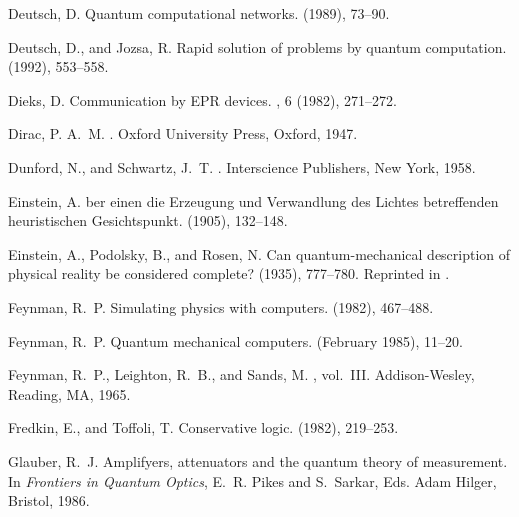 \begin{thebibliography}{100}
{\sc Deutsch, D.}
\newblock Quantum computational networks.
 (1989), 73--90.

{\sc Deutsch, D., and Jozsa, R.}
\newblock Rapid solution of problems by quantum computation.
 (1992),
  553--558.

{\sc Dieks, D.}
\newblock Communication by {EPR} devices.
, 6 (1982), 271--272.

{\sc Dirac, P. A.~M.}
.
\newblock Oxford University Press, Oxford, 1947.

{\sc Dunford, N., and Schwartz, J.~T.}
.
\newblock Interscience Publishers, New York, 1958.

{\sc Einstein, A.}
ber einen die Erzeugung und Verwandlung des Lichtes
  betreffenden heuristischen Gesichtspunkt.
 (1905), 132--148.

{\sc Einstein, A., Podolsky, B., and Rosen, N.}
\newblock Can quantum-mechanical description of physical reality be considered
  complete?
 (1935), 777--780.
\newblock Reprinted in \cite[pp. 138-141]{wheeler-Zurek:83}.

{\sc Feynman, R.~P.}
\newblock Simulating physics with computers.
 (1982),
  467--488.

{\sc Feynman, R.~P.}
\newblock Quantum mechanical computers.
 (February 1985), 11--20.

{\sc Feynman, R.~P., Leighton, R.~B., and Sands, M.}
, vol.~III.
\newblock Addison-Wesley, Reading, MA, 1965.

{\sc Fredkin, E., and Toffoli, T.}
\newblock Conservative logic.
 (1982),
  219--253.

{\sc Glauber, R.~J.}
\newblock Amplifyers, attenuators and the quantum theory of measurement.
\newblock In {\em Frontiers in Quantum Optics}, E.~R. Pikes and S.~Sarkar, Eds.
  Adam Hilger, Bristol, 1986.


\end{thebibliography}
